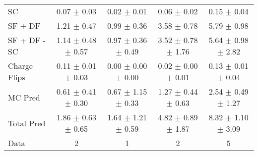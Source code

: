 \begin{tabular}{l|cccc}
                                 SC &  0.07 $\pm$  0.03 &  0.02 $\pm$  0.01 &  0.06 $\pm$  0.02 &  0.15 $\pm$  0.04 \\
                            SF + DF &  1.21 $\pm$  0.47 &  0.99 $\pm$  0.36 &  3.58 $\pm$  0.78 &  5.79 $\pm$  0.98 \\
\hline
                       SF + DF - SC &  1.14 $\pm$  0.48 $\pm$  0.57 &  0.97 $\pm$  0.36 $\pm$  0.49 &  3.52 $\pm$  0.78 $\pm$  1.76 &  5.64 $\pm$  0.98 $\pm$  2.82 \\
\hline\hline
                       Charge Flips &  0.11 $\pm$  0.01 $\pm$  0.03 &  0.00 $\pm$  0.00 $\pm$  0.00 &  0.02 $\pm$  0.00 $\pm$  0.01 &  0.13 $\pm$  0.01 $\pm$  0.04 \\
\hline
                            MC Pred &  0.61 $\pm$  0.41 $\pm$  0.30 &  0.67 $\pm$  1.15 $\pm$  0.33 &  1.27 $\pm$  0.44 $\pm$  0.63 &  2.54 $\pm$  0.49 $\pm$  1.27 \\
\hline
                         Total Pred &  1.86 $\pm$  0.63 $\pm$  0.65 &  1.64 $\pm$  1.21 $\pm$  0.59 &  4.82 $\pm$  0.89 $\pm$  1.87 &  8.32 $\pm$  1.10 $\pm$  3.09 \\
\hline\hline
                               Data &     2 &     1 &     2 &     5 \\
\hline\hline
\end{tabular}

